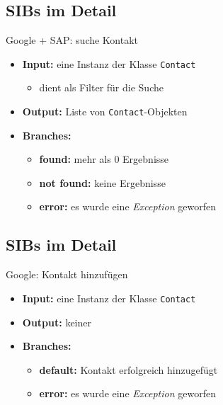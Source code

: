 \subsection*{SIBs im Detail}
\begin{frame}{Google + SAP: suche Kontakt}
\begin{itemize}[<+->]
	\item \textbf{Input:} eine Instanz der Klasse \texttt{Contact} 
		\begin{itemize}[<+->]
			\item dient als Filter für die Suche
		\end{itemize}
	\item \textbf{Output:} Liste von \texttt{Contact}-Objekten

	\item \textbf{Branches:} 
		\begin{itemize}[<+->]
			\item \textbf{found:} mehr als 0 Ergebnisse
			\item \textbf{not found:} keine Ergebnisse
			\item \textbf{error:} es wurde eine \textit{Exception} geworfen
		\end{itemize}
	
\end{itemize}
\end{frame}


\subsection*{SIBs im Detail}
\begin{frame}{Google: Kontakt hinzufügen}
\begin{itemize}[<+->]
	\item \textbf{Input:} eine Instanz der Klasse \texttt{Contact} 

	\item \textbf{Output:} keiner

	\item \textbf{Branches:} 
		\begin{itemize}[<+->]
			\item \textbf{default:} Kontakt erfolgreich hinzugefügt
			\item \textbf{error:} es wurde eine \textit{Exception} geworfen
		\end{itemize}
	
\end{itemize}
\end{frame}


